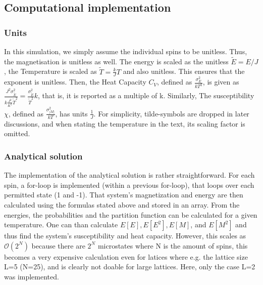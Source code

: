 \documentclass[10pt,a4paper]{article}
\begin{document}
\subsection{Computational implementation}

\subsubsection{Units}
In this simulation, we simply assume the individual spins to be unitless. Thus, the magnetisation is unitless as well.
The energy is scaled as the unitless $\tilde{E}=E/J$, the Temperature is scaled as  $\tilde{T}=\frac{k}{J}T$ and also unitless. This ensures that the exponent is unitless.
Then, the Heat Capacity $C_V$, defined as $\frac{\sigma_E^2}{kT^2}$, is given as $\frac{J^2\sigma^2_{\tilde{E}}}{k\frac{J^2}{K^2} \tilde{T}^2}=\frac{\sigma^2_{\tilde{E}}}{\tilde{T}^2}k$, that is, it is reported as a multiple of k. 
Similarly, The susceptibility $\chi$, defined as $\frac{\sigma_{|M|}^2}{kT}$, has units $\frac{1}{J}$. For simplicity, tilde-symbols are dropped in later discussions, and when stating the temperature in the text, its scaling factor is omitted.
\subsubsection{Analytical solution}
The implementation of the analytical solution is rather straightforward. For each spin, a for-loop is implemented (within a previous for-loop), that loops over each permitted state (1 and -1). That system's magnetization and energy are then calculated using the formulas stated above and stored in an array. From the energies, the probabilities and the partition function can be calculated for a given temperature. One can than calculate $E[E],E[E^2],E[M]$, and $E[M^2]$ and thus find the system's susceptibility and heat capacity. However, this scales as $\mathcal{O}(2^N)$ because there are  $2^N$ microstates where N is the amount of spins, this becomes a very expensive calculation even for latices where e.g. the lattice size L=5 (N=25), and is clearly not doable for large lattices. Here, only the case L=2 was implemented.
\end{document}
